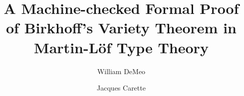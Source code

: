 \documentclass[a4paper,UKenglish,cleveref,autoref,thm-restate]{lipics-v2021}
\title{A Machine-checked Formal Proof of Birkhoff's Variety Theorem in Martin-L\"of Type Theory}
\author{William DeMeo}
       {\url{https://williamdemeo.org}}
       {williamdemeo@gmail.com}{https://orcid.org/0000-0003-1832-5690}{}
\author{Jacques Carette}{McMaster University}{carette@mcmaster.ca}{https://orcid.org/0000-0001-8993-9804}{}
\begin{document}
\maketitle



% 

% 



\providecommand{\hypertarget}[2]{#2}

\renewcommand\texttt[1]{\textsf{#1}}

% 
% 
% 
% 
% 

\end{document}
